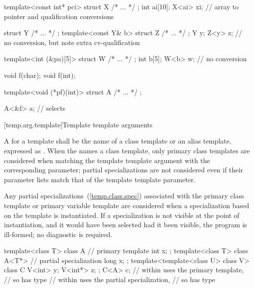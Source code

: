 \enterexample
\begin{codeblock}
template<const int* pci> struct X { /* ... */ };
int ai[10];
X<ai> xi;                       // array to pointer and qualification conversions

struct Y { /* ... */ };
template<const Y& b> struct Z { /* ... */ };
Y y;
Z<y> z;                         // no conversion, but note extra cv-qualification

template<int (&pa)[5]> struct W { /* ... */ };
int b[5];
W<b> w;                         // no conversion

void f(char);
void f(int);

template<void (*pf)(int)> struct A { /* ... */ };

A<&f> a;                        // selects 
\end{codeblock}
\exitexample

[temp.arg.template]{Template template arguments}

\pnum
A
for a template
shall be the name of a class template or an alias template, expressed as
.
When the  names a class
template, only primary class templates are considered when matching the template template
argument with the corresponding parameter; partial specializations are not
considered even if their parameter lists match that of the template template
parameter.

\pnum
Any partial specializations~(\ref{temp.class.spec}) associated with the
primary class template or primary variable template are considered when a
specialization based on the template
is instantiated.
If a specialization is not visible at the point of instantiation,
and it would have been selected had it been visible, the program is ill-formed;
no diagnostic is required.
\enterexample

\begin{codeblock}
template<class T> class A {     // primary template
  int x;
};
template<class T> class A<T*> { // partial specialization
  long x;
};
template<template<class U> class V> class C {
  V<int>  y;
  V<int*> z;
};
C<A> c;                         //  within  uses the primary template,
                                // so  has type 
                                //  within  uses the partial specialization,
                                // so  has type 
\end{codeblock}
\exitexample

